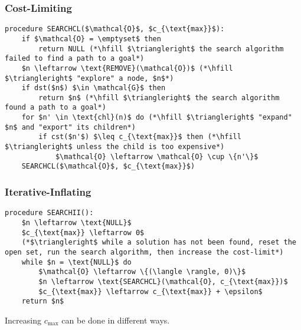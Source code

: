 \subsubsection{Cost-Limiting}
\begin{definition}

\begin{lstlisting}
procedure SEARCHCL($\mathcal{O}$, $c_{\text{max}}$):
    if $\mathcal{O} = \emptyset$ then
        return NULL (*\hfill $\triangleright$ the search algorithm failed to find a path to a goal*)
    $n \leftarrow \text{REMOVE}(\mathcal{O})$ (*\hfill $\triangleright$ "explore" a node, $n$*)
    if dst($n$) $\in \mathcal{G}$ then
        return $n$ (*\hfill $\triangleright$ the search algorithm found a path to a goal*)
    for $n' \in \text{chl}(n)$ do (*\hfill $\triangleright$ "expand" $n$ and "export" its children*)
        if cst($n'$) $\leq c_{\text{max}}$ then (*\hfill $\triangleright$ unless the child is too expensive*)
            $\mathcal{O} \leftarrow \mathcal{O} \cup \{n'\}$
    SEARCHCL($\mathcal{O}$, $c_{\text{max}}$)
\end{lstlisting}

\end{definition}
\newpage

\subsubsection{Iterative-Inflating}
\begin{definition}
\begin{lstlisting}
procedure SEARCHII():
    $n \leftarrow \text{NULL}$
    $c_{\text{max}} \leftarrow 0$
    (*$\triangleright$ while a solution has not been found, reset the open set, run the search algorithm, then increase the cost-limit*)
    while $n = \text{NULL}$ do
        $\mathcal{O} \leftarrow \{(\langle \rangle, 0)\}$
        $n \leftarrow \text{SEARCHCL}(\mathcal{O}, c_{\text{max}})$
        $c_{\text{max}} \leftarrow c_{\text{max}} + \epsilon$
    return $n$
\end{lstlisting}

\end{definition}

\begin{warning}
    Increasing $c_{\text{max}}$ can be done in different ways.
\end{warning}

